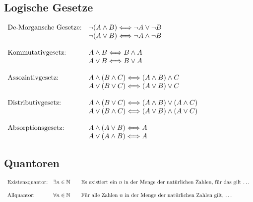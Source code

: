 \documentclass[11pt]{article}
\begin{document}
\subsection{Logische Gesetze}
$
  \begin{array}{l l}
    \text{De-Morgansche Gesetze:} & \lnot(A\land B) \Longleftrightarrow \lnot A \lor \lnot B            \\
                                  & \lnot(A\lor B) \Longleftrightarrow \lnot A \land \lnot B            \\\\
    \text{Kommutativgesetz:}      & A \land B \Longleftrightarrow B \land A                             \\
                                  & A \lor B \Longleftrightarrow B \lor A                               \\\\
    \text{Assoziativgesetz:}      & A \land (B \land C) \Longleftrightarrow (A \land B) \land C         \\
                                  & A \lor (B \lor C) \Longleftrightarrow (A \lor B) \lor C             \\\\
    \text{Distributivgesetz:}     & A \land (B \lor C) \Longleftrightarrow (A \land B) \lor (A \land C) \\
                                  & A \lor (B \land C) \Longleftrightarrow (A \lor B) \land (A \lor C)  \\\\
    \text{Absorptionsgesetz:}     & A \land (A \lor B) \Longleftrightarrow A                            \\
                                  & A \lor (A \land B) \Longleftrightarrow A                            \\
  \end{array}
$

\subsection{Quantoren}
$
  \begin{array}{l l}
    \text{Existenzquantor:} & \exists n \in \mathbb{N}\qquad\text{Es existiert ein $n$ in der Menge der natürlichen Zahlen, für das gilt \ldots} \\\\
    \text{Allquantor:}      & \forall n \in \mathbb{N}\qquad\text{Für alle Zahlen $n$ in der Menge der natürlichen Zahlen gilt, \ldots}          \\\\
  \end{array}
$
\end{document}

